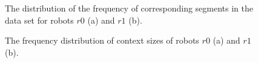 \begin{figure}[h]
\centering
{}
\caption{The distribution of the frequency of corresponding segments in the data set for robots $r0$ (a) and $r1$ (b).}
\label{f:st:distrib_corresp}
\end{figure}\enlargethispage{2\baselineskip}

\begin{figure}[h]
\centering
{}
\caption{The frequency distribution of context sizes of robots $r0$ (a) and $r1$ (b).}
\label{f:st:distribcontext}
\end{figure}

